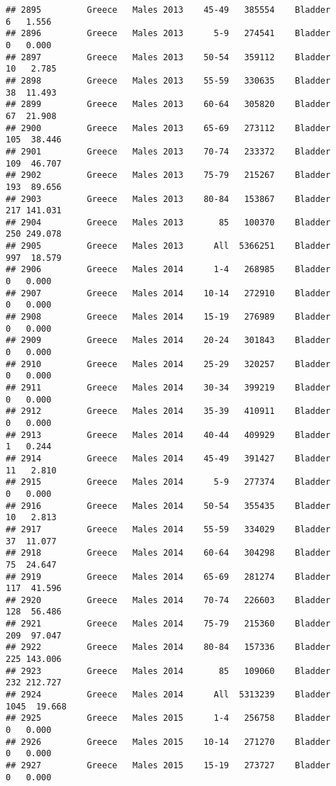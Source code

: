 \documentclass[
]{article}
\begin{document}
\begin{verbatim}
## 2895         Greece   Males 2013    45-49   385554    Bladder      6   1.556
## 2896         Greece   Males 2013      5-9   274541    Bladder      0   0.000
## 2897         Greece   Males 2013    50-54   359112    Bladder     10   2.785
## 2898         Greece   Males 2013    55-59   330635    Bladder     38  11.493
## 2899         Greece   Males 2013    60-64   305820    Bladder     67  21.908
## 2900         Greece   Males 2013    65-69   273112    Bladder    105  38.446
## 2901         Greece   Males 2013    70-74   233372    Bladder    109  46.707
## 2902         Greece   Males 2013    75-79   215267    Bladder    193  89.656
## 2903         Greece   Males 2013    80-84   153867    Bladder    217 141.031
## 2904         Greece   Males 2013       85   100370    Bladder    250 249.078
## 2905         Greece   Males 2013      All  5366251    Bladder    997  18.579
## 2906         Greece   Males 2014      1-4   268985    Bladder      0   0.000
## 2907         Greece   Males 2014    10-14   272910    Bladder      0   0.000
## 2908         Greece   Males 2014    15-19   276989    Bladder      0   0.000
## 2909         Greece   Males 2014    20-24   301843    Bladder      0   0.000
## 2910         Greece   Males 2014    25-29   320257    Bladder      0   0.000
## 2911         Greece   Males 2014    30-34   399219    Bladder      0   0.000
## 2912         Greece   Males 2014    35-39   410911    Bladder      0   0.000
## 2913         Greece   Males 2014    40-44   409929    Bladder      1   0.244
## 2914         Greece   Males 2014    45-49   391427    Bladder     11   2.810
## 2915         Greece   Males 2014      5-9   277374    Bladder      0   0.000
## 2916         Greece   Males 2014    50-54   355435    Bladder     10   2.813
## 2917         Greece   Males 2014    55-59   334029    Bladder     37  11.077
## 2918         Greece   Males 2014    60-64   304298    Bladder     75  24.647
## 2919         Greece   Males 2014    65-69   281274    Bladder    117  41.596
## 2920         Greece   Males 2014    70-74   226603    Bladder    128  56.486
## 2921         Greece   Males 2014    75-79   215360    Bladder    209  97.047
## 2922         Greece   Males 2014    80-84   157336    Bladder    225 143.006
## 2923         Greece   Males 2014       85   109060    Bladder    232 212.727
## 2924         Greece   Males 2014      All  5313239    Bladder   1045  19.668
## 2925         Greece   Males 2015      1-4   256758    Bladder      0   0.000
## 2926         Greece   Males 2015    10-14   271270    Bladder      0   0.000
## 2927         Greece   Males 2015    15-19   273727    Bladder      0   0.000

\end{verbatim}
\end{document}
